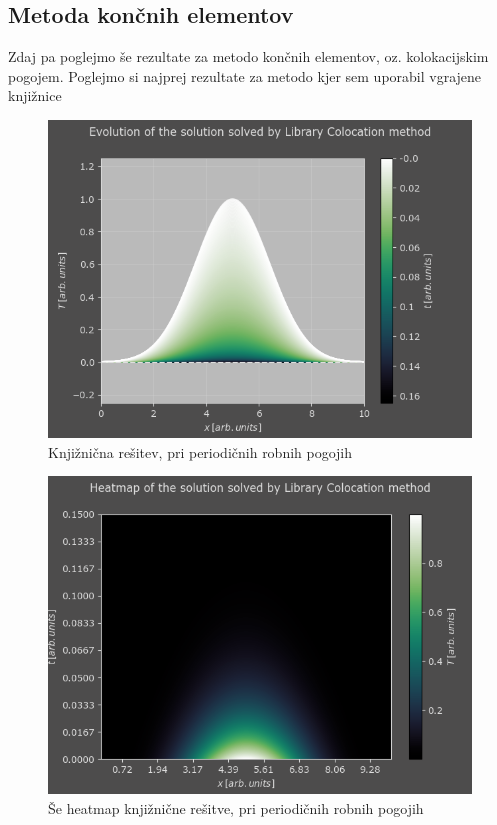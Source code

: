 \documentclass[a4paper]{article}
\begin{document}
\subsection{Metoda končnih elementov}
Zdaj pa poglejmo še rezultate za metodo končnih elementov, oz. kolokacijskim pogojem. Poglejmo si najprej rezultate
za metodo kjer sem uporabil vgrajene knjižnice

\begin{figure}[H]
    \centering
        \includegraphics[width=\linewidth]{./images/C_Proper.png}
        \caption{Knjižnična rešitev, pri periodičnih robnih pogojih}
    \label{fig:7}
\end{figure}

\begin{figure}[H]
    \centering
        \includegraphics[width=\linewidth]{./images/C_Proper_Heatmap.png}
        \caption{Še heatmap knjižnične rešitve, pri periodičnih robnih pogojih}
    \label{fig:8}
\end{figure}
\end{document}
